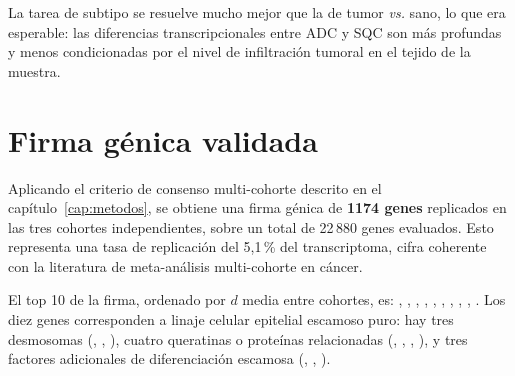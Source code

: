 \begin{table}[H]
  \centering
  \small
  \caption{Rendimiento LODO para la tarea de subtipo ADC \emph{vs.} SQC.}
  \label{tab:lodo_sub}
\end{table}

La tarea de subtipo se resuelve mucho mejor que la de tumor \emph{vs.}
sano, lo que era esperable: las diferencias transcripcionales entre ADC y
SQC son más profundas y menos condicionadas por el nivel de infiltración
tumoral en el tejido de la muestra.

\section{Firma génica validada}
\label{sec:res_firma}

Aplicando el criterio de consenso multi-cohorte descrito en el
capítulo~\ref{cap:metodos}, se obtiene una firma génica de
\textbf{1174 genes} replicados en las tres cohortes independientes, sobre
un total de 22\,880 genes evaluados. Esto representa una tasa de
replicación del 5,1\,\% del transcriptoma, cifra coherente con la
literatura de meta-análisis multi-cohorte en cáncer.

El top 10 de la firma, ordenado por $d$ media entre cohortes, es:
, , , , ,
, , , , . Los
diez genes corresponden a linaje celular epitelial escamoso puro: hay
tres desmosomas (, , ), cuatro queratinas
o proteínas relacionadas (, , ,
), y tres factores adicionales de diferenciación escamosa
(, , ).


